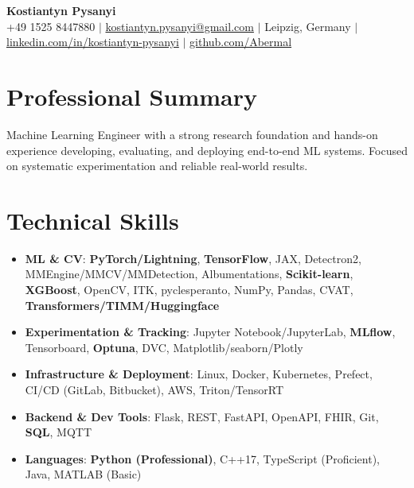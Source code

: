 \documentclass[letterpaper,10pt]{article}
\newcommand{\resumeItem}[1]{
    \item\small{#1}\vspace{-0.5pt}
}
\newcommand{\resumeSubHeadingList}{\begin{itemize}[leftmargin=0.15in, label={}]\vspace{-2pt}}
\newcommand{\resumeSubHeadingListEnd}{\end{itemize}}
\begin{document}
\begin{center}
  \textbf{\Huge Kostiantyn Pysanyi}\vspace{4pt} \\
  \small +49 1525 8447880 $|$ \href{mailto:kostiantyn.pysanyi@gmail.com}{kostiantyn.pysanyi@gmail.com} $|$ Leipzig, Germany $|$
  \href{https://www.linkedin.com/in/kostiantyn-pysanyi/}{linkedin.com/in/kostiantyn-pysanyi} $|$ \href{https://github.com/Abermal}{github.com/Abermal}
\end{center}


\section{Professional Summary}
Machine Learning Engineer with a strong research foundation and hands-on experience developing, evaluating, and deploying end-to-end ML systems. Focused on systematic experimentation and reliable real-world results.

\section{Technical Skills}
\resumeSubHeadingList
  \resumeItem{\textbf{ML \& CV}: \textbf{PyTorch/Lightning}, \textbf{TensorFlow}, JAX, Detectron2, MMEngine/MMCV/MMDetection, Albumentations, \textbf{Scikit-learn}, \textbf{XGBoost}, OpenCV, ITK, pyclesperanto, NumPy, Pandas, CVAT, \textbf{Transformers/TIMM/Huggingface}}
  \resumeItem{\textbf{Experimentation \& Tracking}: Jupyter Notebook/JupyterLab, \textbf{MLflow}, Tensorboard, \textbf{Optuna}, DVC, Matplotlib/seaborn/Plotly}
  \resumeItem{\textbf{Infrastructure \& Deployment}: Linux, Docker, Kubernetes, Prefect, CI/CD (GitLab, Bitbucket), AWS, Triton/TensorRT}
  \resumeItem{\textbf{Backend \& Dev Tools}: Flask, REST, FastAPI, OpenAPI, FHIR, Git, \textbf{SQL}, MQTT}
  \resumeItem{\textbf{Languages}: \textbf{Python (Professional)}, C++17, TypeScript (Proficient), Java, MATLAB (Basic)}
\resumeSubHeadingListEnd
\end{document}
